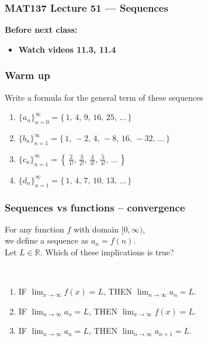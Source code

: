 \documentclass[14pt]{beamer}
\date{}
\title{}
\author{}
\newcommand{\R}{\mathbb{R}}
\begin{document}
\begin{frame}
	\frametitle{MAT137 Lecture 51 --- Sequences}

	\vfill
	{\bf Before next class:}
		\begin{itemize} \normalsize
			\item {\bf Watch videos 11.3, 11.4}
		\end{itemize}
\end{frame}
	\begin{frame}[t]
		\frametitle{Warm up}

		Write a formula for the general term of these sequences
		\vfill
		\begin{enumerate}
			\item ${\displaystyle \{a_n\}_{n=0}^{\infty} = \{ \, 1, \, 4, \, 9, \, 16, \, 25, \, \ldots \, \} }$
				\vfill

			\item ${\displaystyle \{b_n\}_{n=1}^{\infty} = \{ \, 1, \, -2, \, 4, \, -8, \, 16, \, -32, \, \ldots \, \} }$
				\vfill

			\item ${\displaystyle \{c_n\}_{n=1}^{\infty} = \left\{ \, \frac{2}{1!}, \, \frac{3}{2!}, \, \frac{4}{3!}, \, \frac{5}{4!}, \, \ldots \, \right\} }$
				\vfill

			\item ${\displaystyle \{d_n\}_{n=1}^{\infty} = \{ \, 1, \, 4, \, 7, \, 10, \, 13, \, \ldots \, \} }$
		\end{enumerate}
	\end{frame}
	\begin{frame}[t]
		\frametitle{Sequences vs functions -- convergence}

		For any function $f$ with domain $[0, \infty)$, \\ we define a sequence as $a
		_{n} = f(n)$. \\ Let $L \in \R$. Which of these implications is true?

		\

		\begin{enumerate}
			\item IF ${\displaystyle \lim_{x \to \infty} f(x) = L}$, \; THEN
				${\displaystyle \lim_{n \to \infty} a_n = L}$.
				\vfill

			\item IF ${\displaystyle \lim_{n \to \infty} a_n = L}$, \; THEN
				${\displaystyle \lim_{x \to \infty} f(x) = L}$.
				\vfill

			\item IF ${\displaystyle \lim_{n \to \infty} a_n = L}$, \; THEN
				${\displaystyle \lim_{n \to \infty} a_{n+1} = L}$.
		\end{enumerate}
	\end{frame}
\end{document}
